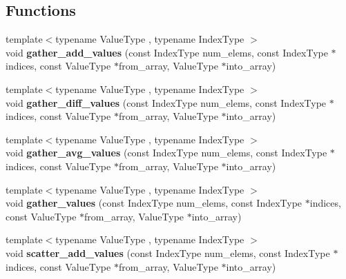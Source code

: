 \subsection*{Functions}
\begin{DoxyCompactItemize}
\item 
\mbox{\label{namespaceschwz_ac8ffee819a786a73e83401fa69803795}} 
{\footnotesize template$<$typename Value\+Type , typename Index\+Type $>$ }\\void {\bfseries gather\+\_\+add\+\_\+values} (const Index\+Type num\+\_\+elems, const Index\+Type $\ast$indices, const Value\+Type $\ast$from\+\_\+array, Value\+Type $\ast$into\+\_\+array)
\item 
\mbox{\label{namespaceschwz_a61c3a595834b5807415d04042ce74715}} 
{\footnotesize template$<$typename Value\+Type , typename Index\+Type $>$ }\\void {\bfseries gather\+\_\+diff\+\_\+values} (const Index\+Type num\+\_\+elems, const Index\+Type $\ast$indices, const Value\+Type $\ast$from\+\_\+array, Value\+Type $\ast$into\+\_\+array)
\item 
\mbox{\label{namespaceschwz_a896f3d4b86393dc8ce73982e23073d9a}} 
{\footnotesize template$<$typename Value\+Type , typename Index\+Type $>$ }\\void {\bfseries gather\+\_\+avg\+\_\+values} (const Index\+Type num\+\_\+elems, const Index\+Type $\ast$indices, const Value\+Type $\ast$from\+\_\+array, Value\+Type $\ast$into\+\_\+array)
\item 
\mbox{\label{namespaceschwz_ac0d7361baa5ceaa2596da4586960cafc}} 
{\footnotesize template$<$typename Value\+Type , typename Index\+Type $>$ }\\void {\bfseries gather\+\_\+values} (const Index\+Type num\+\_\+elems, const Index\+Type $\ast$indices, const Value\+Type $\ast$from\+\_\+array, Value\+Type $\ast$into\+\_\+array)
\item 
\mbox{\label{namespaceschwz_ab76087fa81e1d29484501e5f3a193ed5}} 
{\footnotesize template$<$typename Value\+Type , typename Index\+Type $>$ }\\void {\bfseries scatter\+\_\+add\+\_\+values} (const Index\+Type num\+\_\+elems, const Index\+Type $\ast$indices, const Value\+Type $\ast$from\+\_\+array, Value\+Type $\ast$into\+\_\+array)

\end{DoxyCompactItemize}
